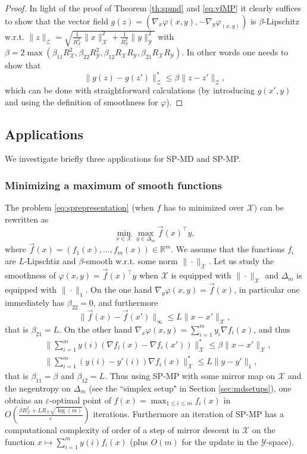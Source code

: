 \documentclass[openany]{now}
\renewcommand{\phi}{\varphi}
\newcommand{\R}{\mathbb{R}}
\newcommand{\cZ}{\mathcal{Z}}
\newcommand{\cX}{\mathcal{X}}
\newcommand{\cY}{\mathcal{Y}}
\renewcommand{\epsilon}{\varepsilon}
\begin{document}
\begin{proof}
In light of the proof of Theorem \ref{th:spmd} and \eqref{eq:vfMP} it clearly suffices to show that the vector field $g(z) = (\nabla_x \phi(x,y), - \nabla_y \phi_(x,y))$ is $\beta$-Lipschitz w.r.t. $\|z\|_{\cZ} = \sqrt{\frac{1}{R_{\cX}^2} \|x\|_{\mathcal{X}}^2 + \frac{1}{R_{\cY}^2} \|y\|_{\mathcal{Y}}^2}$ with $\beta = 2 \max \left(\beta_{11} R^2_{\cX}, \beta_{22} R^2_{\cY}, \beta_{12} R_{\cX} R_{\cY}, \beta_{21} R_{\cX} R_{\cY}\right)$. In other words one needs to show that
$$\|g(z) - g(z')\|_{\cZ}^* \leq \beta \|z - z'\|_{\cZ} ,$$
which can be done with straightforward calculations (by introducing $g(x',y)$ and using the definition of smoothness for $\phi$).
\end{proof}

\subsection{Applications} \label{sec:spex}
We investigate briefly three applications for SP-MD and SP-MP.

\subsubsection{Minimizing a maximum of smooth functions} \label{sec:spex1}
The problem \eqref{eq:sprepresentation} (when $f$ has to minimized over $\cX$) can be rewritten as
$$\min_{x \in \cX} \max_{y \in \Delta_m} \vec{f}(x)^{\top} y ,$$
where $\vec{f}(x) = (f_1(x), \hdots, f_m(x)) \in \R^m$. We assume that the functions $f_i$ are $L$-Lipschtiz and $\beta$-smooth w.r.t. some norm $\|\cdot\|_{\cX}$. Let us study the smoothness of $\phi(x,y) = \vec{f}(x)^{\top} y$ when $\cX$ is equipped with $\|\cdot\|_{\cX}$ and $\Delta_m$ is equipped with $\|\cdot\|_1$. On the one hand $\nabla_y \phi(x,y) = \vec{f}(x)$, in particular one immediately has $\beta_{22}=0$, and furthermore
$$ \|\vec{f}(x)  - \vec{f}(x') \|_{\infty} \leq L \|x-x'\|_{\mathcal{X}} , $$
that is $\beta_{21}=L$. On the other hand $\nabla_x \phi(x,y) = \sum_{i=1}^m y_i \nabla f_i(x)$, and thus
\begin{align*}
& \|\sum_{i=1}^m y(i) (\nabla f_i(x) - \nabla f_i(x')) \|_{\cX}^* \leq \beta \|x-x'\|_{\cX} , \\
& \|\sum_{i=1}^m (y(i)-y'(i)) \nabla f_i(x) \|_{\cX}^* \leq L\|y-y'\|_1 ,
\end{align*}
that is $\beta_{11} = \beta$ and $\beta_{12} = L$. Thus using SP-MP with some mirror map on $\cX$ and the negentropy on $\Delta_m$ (see the ``simplex setup" in Section \ref{sec:mdsetups}), one obtains an $\epsilon$-optimal point of $f(x) = \max_{1 \leq i \leq m} f_i(x)$ in $O\left(\frac{\beta R_{\cX}^2 + L R_{\cX} \sqrt{\log(m)}}{\epsilon} \right)$ iterations. Furthermore an iteration of SP-MP has a computational complexity of order of a step of mirror descent in $\cX$ on the function $x \mapsto \sum_{i=1}^m y(i) f_i(x)$ (plus $O(m)$ for the update in the $\cY$-space).
\end{document}
